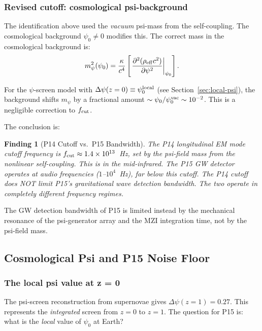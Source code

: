 \documentclass[11pt]{article}
\newtheorem{finding}{Finding}[section]
\theoremstyle{definition}
\theoremstyle{remark}
\newcommand{\ee}[1]{\times 10^{#1}}
\begin{document}
\subsubsection{Revised cutoff: cosmological psi-background}

The identification above used the \emph{vacuum} psi-mass from the self-coupling.
The cosmological background $\psi_0 \neq 0$ modifies this. The correct mass
in the cosmological background is:
\begin{equation}
m_\psi^2(\psi_0) = \frac{\kappa}{c^4}\left[\left.\frac{\partial^2(\rho_{\rm eff}
c^2)}{\partial\psi^2}\right|_{\psi_0}\right].
\end{equation}

For the $\psi$-screen model with $\Delta\psi(z=0) \equiv \psi_0^{\rm local}$
(see Section~\ref{sec:local-psi}), the background shifts $m_\psi$ by a
fractional amount $\sim \psi_0/\psi_0^{\rm vac} \sim 10^{-2}$. This is
a negligible correction to $f_{\rm cut}$.

The conclusion is:
\begin{finding}[P14 Cutoff vs.\ P15 Bandwidth]
The P14 longitudinal EM mode cutoff frequency is $f_{\rm cut} \approx 1.4\ee{13}$~Hz,
set by the psi-field mass from the nonlinear self-coupling. This is in the
mid-infrared. The P15 GW detector operates at audio frequencies
($1$--$10^4$~Hz), far below this cutoff. The P14 cutoff does NOT limit P15's
gravitational wave detection bandwidth. The two operate in completely
different frequency regimes.
\end{finding}

The GW detection bandwidth of P15 is limited instead by the mechanical
resonance of the psi-generator array and the MZI integration time, not by
the psi-field mass.

\subsection{Cosmological Psi and P15 Noise Floor}
\label{sec:cosmo-noise}

\subsubsection{The local psi value at z = 0}

The psi-screen reconstruction from supernovae gives $\Delta\psi(z=1) = 0.27$.
This represents the \emph{integrated} screen from $z=0$ to $z=1$. The
question for P15 is: what is the \emph{local} value of $\psi_0$ at Earth?
\end{document}
